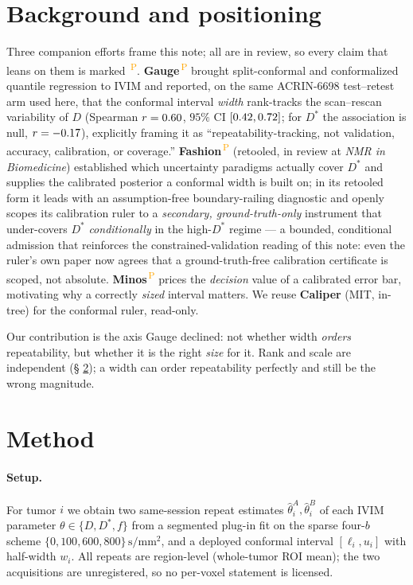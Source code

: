 \documentclass[11pt]{article}
\newcommand{\PROV}{\textsuperscript{\textcolor{orange}{\,P}}}
\newcommand{\Dstar}{D^{*}}
\begin{document}
\section{Background and positioning}\label{sec:bg}
Three companion efforts frame this note; all are in review, so every claim that leans on
them is marked \PROV{}. \textbf{Gauge}\PROV{} brought split-conformal and conformalized
quantile regression to IVIM and reported, on the same ACRIN-6698 test--retest arm used
here, that the conformal interval \emph{width} rank-tracks the scan--rescan variability of
$D$ (Spearman $r=0.60$, $95\%$ CI $[0.42,0.72]$; for $\Dstar$ the
association is null, $r=-0.17$), explicitly framing it as ``repeatability-tracking,
not validation, accuracy, calibration, or coverage.'' \textbf{Fashion}\PROV{} (retooled,
in review at \textit{NMR in Biomedicine}) established which uncertainty paradigms actually
cover $\Dstar$ and supplies the calibrated posterior a conformal width is built on; in its
retooled form it leads with an assumption-free boundary-railing diagnostic and openly scopes
its calibration ruler to a \emph{secondary, ground-truth-only} instrument that under-covers
$\Dstar$ \emph{conditionally} in the high-$\Dstar$ regime --- a bounded, conditional admission
that reinforces the constrained-validation reading of this note: even the ruler's own paper
now agrees that a ground-truth-free calibration certificate is scoped, not absolute.
\textbf{Minos}\PROV{} prices the \emph{decision} value of a
calibrated error bar, motivating why a correctly \emph{sized} interval matters. We reuse
\textbf{Caliper} (MIT, in-tree) for the conformal ruler, read-only.

Our contribution is the axis Gauge declined: not whether width \emph{orders} repeatability,
but whether it is the right \emph{size} for it. Rank and scale are independent (\S
\ref{sec:method}); a width can order repeatability perfectly and still be the wrong
magnitude.

\section{Method}\label{sec:method}
\paragraph{Setup.} For tumor $i$ we obtain two same-session repeat estimates
$\hat\theta^{A}_i,\hat\theta^{B}_i$ of each IVIM parameter $\theta\in\{D,\Dstar,f\}$ from a
segmented plug-in fit on the sparse four-$b$ scheme $\{0,100,600,800\}\,\mathrm{s/mm^2}$,
and a deployed conformal interval $[\ell_i,u_i]$ with half-width $w_i$. All repeats are
region-level (whole-tumor ROI mean); the two acquisitions are unregistered, so no per-voxel
statement is licensed.
\end{document}
